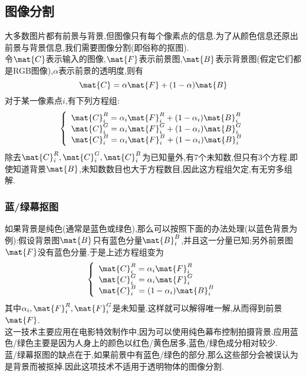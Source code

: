 \documentclass{ctexart}
\begin{document}
\subsection{图像分割}
大多数图片都有前景与背景,但图像只有每个像素点的信息.为了从颜色信息还原出前景与背景信息,我们需要图像分割(即俗称的抠图).\\
\indent 令$\mat{C}$表示输入的图像,$\mat{F}$表示前景图,$\mat{B}$表示背景图(假定它们都是RGB图像),$\alpha$表示前景的透明度,则有
\[\mat{C}=\alpha\mat{F}+(1-\alpha)\mat{B}\]
对于某一像素点$i$,有下列方程组:
\[\left\{\begin{array}{l}
    \mat{C}_i^R=\alpha_i\mat{F}_i^R+(1-\alpha_i)\mat{B}_i^R\\
    \mat{C}_i^G=\alpha_i\mat{F}_i^G+(1-\alpha_i)\mat{B}_i^G\\
    \mat{C}_i^B=\alpha_i\mat{F}_i^B+(1-\alpha_i)\mat{B}_i^B
\end{array}\right.\]
除去$\mat{C}_i^R,\mat{C}_i^G,\mat{C}_i^B$为已知量外,有7个未知数,但只有3个方程.即使知道背景$\mat{B}$,未知数数目也大于方程数目,因此这方程组欠定,有无穷多组解.
\subsubsection{蓝/绿幕抠图}
如果背景是纯色(通常是蓝色或绿色),那么可以按照下面的办法处理(以蓝色背景为例):假设背景图$\mat{B}$只有蓝色分量$\mat{B}_i^B$,并且这一分量已知;另外前景图$\mat{F}$没有蓝色分量.于是上述方程组变为
\[\left\{\begin{array}{l}
    \mat{C}_i^R=\alpha_i\mat{F}_i^R\\
    \mat{C}_i^G=\alpha_i\mat{F}_i^G\\
    \mat{C}_i^B=(1-\alpha_i)\mat{B}_i^B
\end{array}\right.\]
其中$\alpha_i,\mat{F}_i^R,\mat{F}_i^G$是未知量.这样就可以解得唯一解,从而得到前景$\mat{F}$.\\
\indent 这一技术主要应用在电影特效制作中,因为可以使用纯色幕布控制拍摄背景.应用蓝色/绿色主要是因为人身上的颜色以红色/黄色居多,蓝色/绿色成分相对较少.\\
\indent 蓝/绿幕抠图的缺点在于,如果前景中有蓝色/绿色的部分,那么这些部分会被误认为是背景而被抠掉.因此这项技术不适用于透明物体的图像分割.
\end{document}
